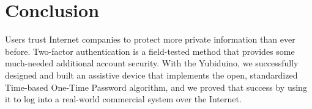 \documentclass[conference]{IEEEtran}
\begin{document}
\section{Conclusion}
Users trust Internet companies to protect more private information than ever before. Two-factor authentication is a field-tested method that provides some much-needed additional account security. With the Yubiduino, we successfully designed and built an assistive device that implements the open, standardized Time-based One-Time Password algorithm, and we proved that success by using it to log into a real-world commercial system over the Internet.





\nocite{totp,
        mfa,
        totp_david,
        arduino_due,
        serial,
        mouse,
        strong_mfa,
        keyboard,
        sd,
        spi,
        rfc,
        authy,
        github}


%




\end{document}
